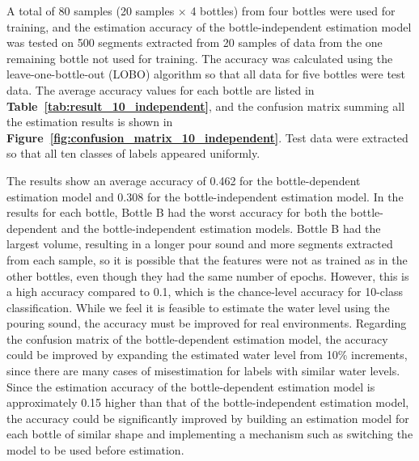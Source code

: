 \documentclass[sigconf,authordraft]{acmart}
\newcommand\figref[1]{\textbf{Figure~\ref{fig:#1}}}
\newcommand\tabref[1]{\textbf{Table~\ref{tab:#1}}}
\begin{document}
A total of 80 samples (20 samples $\times$ 4 bottles) from four bottles were used for training, and the estimation accuracy of the bottle-independent estimation model was tested on 500 segments extracted from 20 samples of data from the one remaining bottle not used for training. The accuracy was calculated using the leave-one-bottle-out (LOBO) algorithm so that all data for five bottles were test data. The average accuracy values for each bottle are listed in \tabref{result_10_independent}, and the confusion matrix summing all the estimation results is shown in \figref{confusion_matrix_10_independent}. Test data were extracted so that all ten classes of labels appeared uniformly.\par

The results show an average accuracy of 0.462 for the bottle-dependent estimation model and 0.308 for the bottle-independent estimation model. In the results for each bottle, Bottle B had the worst accuracy for both the bottle-dependent and the bottle-independent estimation models. Bottle B had the largest volume, resulting in a longer pour sound and more segments extracted from each sample, so it is possible that the features were not as trained as in the other bottles, even though they had the same number of epochs. However, this is a high accuracy compared to 0.1, which is the chance-level accuracy for 10-class classification. While we feel it is feasible to estimate the water level using the pouring sound, the accuracy must be improved for real environments. Regarding the confusion matrix of the bottle-dependent estimation model, the accuracy could be improved by expanding the estimated water level from 10\% increments, since there are many cases of misestimation for labels with similar water levels. Since the estimation accuracy of the bottle-dependent estimation model is approximately 0.15 higher than that of the bottle-independent estimation model, the accuracy could be significantly improved by building an estimation model for each bottle of similar shape and implementing a mechanism such as switching the model to be used before estimation.
\end{document}
